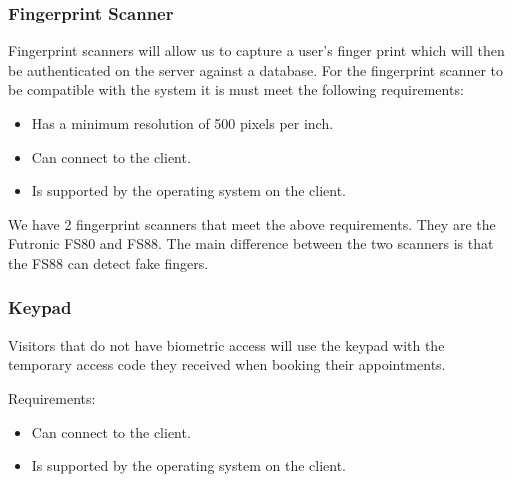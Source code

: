 	\subsubsection{Fingerprint Scanner}
	Fingerprint scanners will allow us to capture a user's finger print which will then be authenticated on the server against a database. For the fingerprint scanner to be compatible with the system it is must meet the following requirements:
	\begin{itemize}
		\item Has a minimum resolution of 500 pixels per inch.
		\item Can connect to the client.
		\item Is supported by the operating system on the client.
	\end{itemize}
	
We have 2 fingerprint scanners that meet the above requirements. They are the Futronic FS80 and FS88. The main difference between the two scanners is that the FS88 can detect fake fingers.
	
	\subsubsection{Keypad}
Visitors that do not have biometric access will use the keypad with the temporary access code they received when booking their appointments.

Requirements:
	\begin{itemize}
		\item Can connect to the client.
		\item Is supported by the operating system on the client.
	\end{itemize}


		